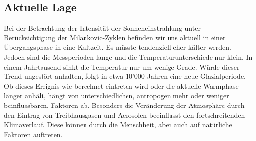 \subsection{Aktuelle Lage
\label{milankovic:subsection:AktuelleLage}}
Bei der Betrachtung der Intensität der Sonneneinstrahlung unter Berücksichtigung der Milankovic-Zyklen befinden wir uns aktuell in einer Übergangsphase in eine Kaltzeit.
Es müsste tendenziell eher kälter werden.
Jedoch sind die Messperioden lange und die Temperaturunterschiede nur klein.
In einem Jahrtausend sinkt die Temperatur nur um wenige Grade.
Würde dieser Trend ungestört anhalten, folgt in etwa 10'000 Jahren eine neue Glazialperiode.
Ob dieses Ereignis wie berechnet eintreten wird oder die aktuelle Warmphase länger anhält, hängt von unterschiedlichen, antropogen mehr oder weniger beinflussbaren, Faktoren ab. Besonders die Veränderung der Atmosphäre durch den Eintrag von Treibhausgasen und Aerosolen beeinflusst den fortschreitenden Klimaverlauf.
Diese können durch die Menschheit, aber auch auf natürliche Faktoren auftreten.


